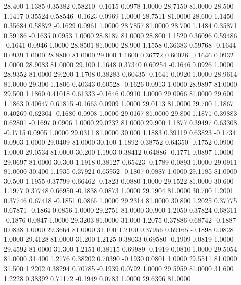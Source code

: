   28.400   1.1385   0.35382   0.58210  -0.1615   0.0978   1.0000  28.7150  81.0000
  28.500   1.1417   0.35524   0.58546  -0.1623   0.0969   1.0000  28.7511  81.0000
  28.600   1.1450   0.35684   0.58872  -0.1629   0.0961   1.0000  28.7857  81.0000
  28.700   1.1484   0.35871   0.59186  -0.1635   0.0953   1.0000  28.8187  81.0000
  28.800   1.1520   0.36096   0.59486  -0.1641   0.0946   1.0000  28.8501  81.0000
  28.900   1.1558   0.36383   0.59768  -0.1644   0.0939   1.0000  28.8800  81.0000
  29.000   1.1600   0.36772   0.60026  -0.1646   0.0932   1.0000  28.9083  81.0000
  29.100   1.1648   0.37340   0.60254  -0.1646   0.0926   1.0000  28.9352  81.0000
  29.200   1.1708   0.38283   0.60435  -0.1641   0.0920   1.0000  28.9614  81.0000
  29.300   1.1806   0.40343   0.60528  -0.1626   0.0913   1.0000  28.9897  81.0000
  29.500   1.1860   0.41018   0.61333  -0.1646   0.0910   1.0000  29.0066  81.0000
  29.600   1.1863   0.40647   0.61815  -0.1663   0.0909   1.0000  29.0113  81.0000
  29.700   1.1867   0.40269   0.62304  -0.1680   0.0908   1.0000  29.0167  81.0000
  29.800   1.1871   0.39883   0.62801  -0.1697   0.0906   1.0000  29.0232  81.0000
  29.900   1.1877   0.39497   0.63308  -0.1715   0.0905   1.0000  29.0311  81.0000
  30.000   1.1883   0.39119   0.63823  -0.1734   0.0903   1.0000  29.0409  81.0000
  30.100   1.1892   0.38752   0.64350  -0.1752   0.0900   1.0000  29.0534  81.0000
  30.200   1.1903   0.38412   0.64886  -0.1771   0.0897   1.0000  29.0697  81.0000
  30.300   1.1918   0.38127   0.65423  -0.1789   0.0893   1.0000  29.0911  81.0000
  30.400   1.1935   0.37921   0.65952  -0.1807   0.0887   1.0000  29.1185  81.0000
  30.500   1.1955   0.37799   0.66462  -0.1823   0.0880   1.0000  29.1522  81.0000
  30.600   1.1977   0.37748   0.66950  -0.1838   0.0873   1.0000  29.1904  81.0000
  30.700   1.2001   0.37746   0.67418  -0.1851   0.0865   1.0000  29.2314  81.0000
  30.800   1.2025   0.37775   0.67871  -0.1864   0.0856   1.0000  29.2751  81.0000
  30.900   1.2050   0.37824   0.68311  -0.1876   0.0847   1.0000  29.3203  81.0000
  31.000   1.2075   0.37886   0.68742  -0.1887   0.0838   1.0000  29.3664  81.0000
  31.100   1.2100   0.37956   0.69165  -0.1898   0.0828   1.0000  29.4128  81.0000
  31.200   1.2125   0.38033   0.69580  -0.1909   0.0819   1.0000  29.4592  81.0000
  31.300   1.2151   0.38115   0.69989  -0.1919   0.0810   1.0000  29.5054  81.0000
  31.400   1.2176   0.38202   0.70390  -0.1930   0.0801   1.0000  29.5511  81.0000
  31.500   1.2202   0.38294   0.70785  -0.1939   0.0792   1.0000  29.5959  81.0000
  31.600   1.2228   0.38392   0.71172  -0.1949   0.0783   1.0000  29.6396  81.0000
